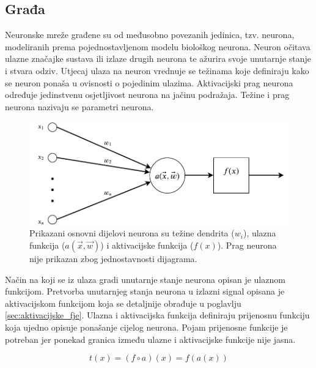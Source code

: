 \documentclass[times, utf8, numeric, diplomski]{fer}
\begin{document}
\subsection{Građa}
Neuronske mreže građene su od međusobno povezanih jedinica, tzv. neurona, modeliranih prema pojednostavljenom modelu biološkog neurona. Neuron očitava ulazne značajke sustava ili izlaze drugih neurona te ažurira svoje unutarnje stanje i stvara odziv. Utjecaj ulaza na neuron vrednuje se težinama  koje definiraju kako se neuron ponaša u ovisnosti o pojedinim ulazima. Aktivacijski prag neurona  određuje jedinstvenu osjetljivost neurona na jačinu podražaja. Težine i prag neurona nazivaju se parametri neurona.

\begin{figure}[h]
\centering
\includegraphics[scale=0.7]{Neuron.pdf}
\caption{Prikazani osnovni dijelovi neurona su težine dendrita ($w_i$), ulazna funkcija ($a(\vec{x},\vec{w})$) i aktivacijske funkcija ($f(x)$). Prag neurona nije prikazan zbog jednostavnosti dijagrama.}
\label{fig:neuron}
\end{figure}

Način na koji se iz ulaza gradi unutarnje stanje neurona opisan je ulaznom funkcijom. Pretvorba unutarnjeg stanja neurona u izlazni signal opisana je aktivacijskom funkcijom koja se detaljnije obrađuje u poglavlju \ref{sec:aktivacijske_fje}. Ulazna i aktivacijska funkcija definiraju prijenosnu funkciju koja ujedno opisuje ponašanje cijelog neurona. Pojam prijenosne funkcije je potreban jer ponekad granica između ulazne i aktivacijske funkcije nije jasna.

\begin{equation}
t(x) = (f \circ a)(x) = f(a(x))
\end{equation}
\end{document}
